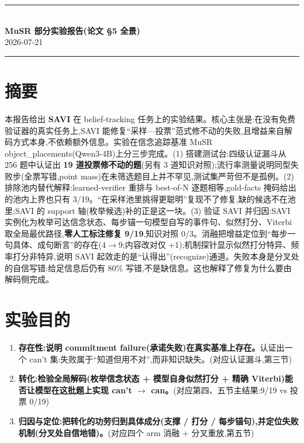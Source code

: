 \documentclass[fontset=none,10.5pt]{ctexart}
\begin{document}
\thispagestyle{empty}

\begin{center}
{\color{accent}\rule{\linewidth}{1.2pt}}\\[0.6em]
{\LARGE\bfseries\color{accent} MuSR 部分实验报告(论文 \S 5 全景)}\\[0.5em]
{\small\color{black!55} 2026-07-21}\\[0.55em]
{\color{accent}\rule{\linewidth}{0.5pt}}
\end{center}
\vspace{0.4em}

\section*{摘要}

本报告给出 \textbf{SAVI} 在 belief-tracking 任务上的实验结果。核心主张是:在没有免费验证器的真实任务上,SAVI 能修复``采样—投票''范式修不动的失败,且增益来自解码方式本身,不依赖额外信息。实验在信念追踪基准 MuSR object\_placements(Qwen3-4B)上分三步完成。(1) 搭建测试台:四级认证漏斗从 256 题中认证出 \textbf{19 道投票修不动的题}(另有 3 道知识对照);流行率测量说明同型失败步(全票写错,point mass)在未筛选题目上并不罕见,测试集严苛但不是孤例。(2) 排除池内替代解释:learned-verifier 重排与 best-of-N 逐题相等,gold-facts 掩码给出的池内上界也只有 3/19。``在采样池里挑得更聪明''复现不了修复,缺的候选不在池里;SAVI 的 support 轴(枚举候选)补的正是这一块。(3) 验证 SAVI 并归因:SAVI 实例化为枚举可达信念状态、每步锚一句模型自写的事件句、似然打分、Viterbi 取全局最优路径,\textbf{零人工标注修复 9/19},知识对照 0/3。消融把增益定位到``每步一句具体、成句断言''的存在(4$\to$9;内容改对仅 +1);机制探针显示似然打分特异、频率打分非特异,说明 SAVI 起效走的是``认得出''(recognize)通道。失败本身是分叉处的自信写错:给足信息后仍有 80\% 写错,不是缺信息。这也解释了修复为什么要由解码侧完成。

\section{实验目的}

\begin{enumerate}
\item \textbf{存在性:说明 commitment failure(承诺失败)在真实基准上存在。}认证出一个 can't 集:失败属于``知道但用不对'',而非知识缺失。(对应认证漏斗,第三节)
\item \textbf{转化:检验全局解码(枚举信念状态 + 模型自身似然打分 + 精确 Viterbi)能否让模型在这批题上实现 can't $\to$ can。}(对应第四、五节主结果:9/19 vs 投票 0/19)
\item \textbf{归因与定位:把转化的功劳归到具体成分(支撑 / 打分 / 每步锚句),并定位失败机制(分叉处自信地错)。}(对应四个 arm 消融 + 分叉重放,第五节)
\end{enumerate}
\end{document}
